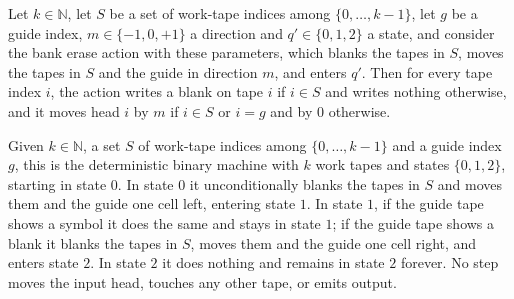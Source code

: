 \begin{lemma}
\label{Turing.un_bankAct_eq}
\leanok
{}
Let $k\in\mathbb{N}$, let $S$ be a set of work-tape indices among $\{0,\dots,k-1\}$, let $g$ be a
guide index, $m\in\{-1,0,+1\}$ a direction and $q'\in\{0,1,2\}$ a state, and consider the bank
erase action with these parameters, which blanks the tapes in $S$, moves the tapes in $S$ and the
guide in direction $m$, and enters $q'$. Then for every tape index $i$, the action writes a blank
on tape $i$ if $i\in S$ and writes nothing otherwise, and it moves head $i$ by $m$ if $i\in S$ or
$i=g$ and by $0$ otherwise.
\end{lemma}

\begin{definition}
\label{Turing.un_bankTM}
\leanok
{}
Given $k\in\mathbb{N}$, a set $S$ of work-tape indices among $\{0,\dots,k-1\}$ and a guide index
$g$, this is the deterministic binary machine with $k$ work tapes and states $\{0,1,2\}$, starting
in state $0$. In state $0$ it unconditionally blanks the tapes in $S$ and moves them and the guide
one cell left, entering state $1$. In state $1$, if the guide tape shows a symbol it does the same
and stays in state $1$; if the guide tape shows a blank it blanks the tapes in $S$, moves them and
the guide one cell right, and enters state $2$. In state $2$ it does nothing and remains in state
$2$ forever. No step moves the input head, touches any other tape, or emits output.
\end{definition}

